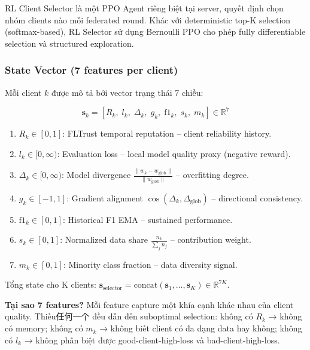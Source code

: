 \documentclass[12pt,a4paper]{article}
\begin{document}
RL Client Selector là một PPO Agent riêng biệt tại server, quyết định chọn nhóm clients nào mỗi federated round. Khác với deterministic top-K selection (softmax-based), RL Selector sử dụng Bernoulli PPO cho phép fully differentiable selection và structured exploration.

\subsubsection{State Vector (7 features per client)}

Mỗi client $k$ được mô tả bởi vector trạng thái 7 chiều:

\begin{equation}
    \mathbf{s}_k = \left[R_k,\; l_k,\; \Delta_k,\; g_k,\; \mathrm{f1}_k,\; s_k,\; m_k\right] \in \mathbb{R}^7 \label{eq:selector_state}
\end{equation}

\begin{enumerate}
    \item $R_k \in [0, 1]$: FLTrust temporal reputation -- client reliability history.
    \item $l_k \in [0, \infty)$: Evaluation loss -- local model quality proxy (negative reward).
    \item $\Delta_k \in [0, \infty)$: Model divergence $\frac{\|w_k - w_{\text{glob}}\|}{\|w_{\text{glob}}\|}$ -- overfitting degree.
    \item $g_k \in [-1, 1]$: Gradient alignment $\cos(\Delta_k, \Delta_{\text{glob}})$ -- directional consistency.
    \item $\mathrm{f1}_k \in [0, 1]$: Historical F1 EMA -- sustained performance.
    \item $s_k \in [0, 1]$: Normalized data share $\frac{n_k}{\sum_j n_j}$ -- contribution weight.
    \item $m_k \in [0, 1]$: Minority class fraction -- data diversity signal.
\end{enumerate}

Tổng state cho K clients: $\mathbf{s}_{\text{selector}} = \text{concat}(\mathbf{s}_1, \ldots, \mathbf{s}_K) \in \mathbb{R}^{7K}$.

\textbf{Tại sao 7 features?} Mỗi feature capture một khía cạnh khác nhau của client quality. Thiếu任何一个 đều dẫn đến suboptimal selection: không có $R_k$ → không có memory; không có $m_k$ → không biết client có đa dạng data hay không; không có $l_k$ → không phân biệt được good-client-high-loss và bad-client-high-loss.
\end{document}
